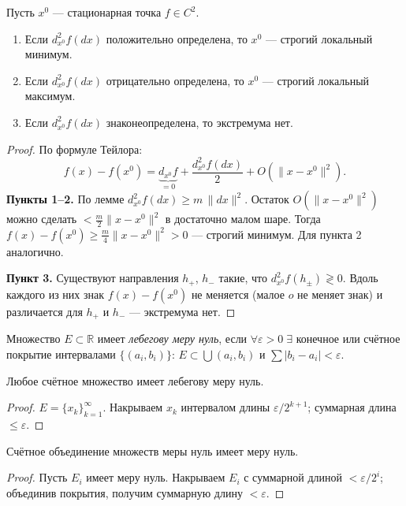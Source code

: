 \begin{theorem}
  Пусть $x^0$ --- стационарная точка $f \in C^2$.
  \begin{enumerate}
    \item Если $d^2_{x^0}f(dx)$ положительно определена, то $x^0$ --- строгий локальный минимум.
    \item Если $d^2_{x^0}f(dx)$ отрицательно определена, то $x^0$ --- строгий локальный максимум.
    \item Если $d^2_{x^0}f(dx)$ знаконеопределена, то экстремума нет.
  \end{enumerate}
  \begin{proof}
    По формуле Тейлора:
    \[
      f(x) - f(x^0) = \underbrace{d_{x^0}f}_{=0} + \frac{d^2_{x^0}f(dx)}{2} + O(\|x-x^0\|^2).
    \]
    \textbf{Пункты 1--2.} По лемме $d^2_{x^0}f(dx) \geq m\,\|dx\|^2$.
    Остаток $O(\|x-x^0\|^2)$ можно сделать $< \tfrac{m}{2}\|x-x^0\|^2$ в достаточно малом шаре.
    Тогда $f(x) - f(x^0) \geq \tfrac{m}{4}\|x-x^0\|^2 > 0$ --- строгий минимум.
    Для пункта 2 аналогично.

    \textbf{Пункт 3.} Существуют направления $h_+$, $h_-$ такие, что $d^2_{x^0}f(h_\pm) \gtrless 0$.
    Вдоль каждого из них знак $f(x) - f(x^0)$ не меняется (малое $o$ не меняет знак)
    и различается для $h_+$ и $h_-$ --- экстремума нет. \qedhere
  \end{proof}
\end{theorem}


\begin{defn}
  Множество $E \subset \mathbb{R}$ имеет \emph{лебегову меру нуль}, если
  $\forall\varepsilon>0\;\exists$ конечное или счётное покрытие интервалами $\{(a_i, b_i)\}$:
  $E \subset \bigcup (a_i, b_i)$ и $\sum |b_i - a_i| < \varepsilon$.
\end{defn}

\begin{lemma}
  Любое счётное множество имеет лебегову меру нуль.
  \begin{proof}
    $E = \{x_k\}_{k=1}^\infty$. Накрываем $x_k$ интервалом длины $\varepsilon/2^{k+1}$;
    суммарная длина $\leq \varepsilon$. \qedhere
  \end{proof}
\end{lemma}

\begin{lemma}
  Счётное объединение множеств меры нуль имеет меру нуль.
  \begin{proof}
    Пусть $E_i$ имеет меру нуль. Накрываем $E_i$ с суммарной длиной $< \varepsilon/2^i$;
    объединив покрытия, получим суммарную длину $< \varepsilon$. \qedhere
  \end{proof}
\end{lemma}

